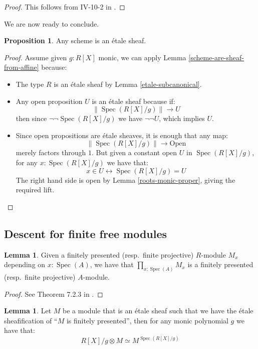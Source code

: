 \documentclass[10pt,a4paper]{article}
\theoremstyle{definition}
\newtheorem{lemma}[theorem]{Lemma}
\newtheorem{proposition}[theorem]{Proposition}
\DeclareMathOperator{\Spec}{Spec}
\newcommand{\propTrunc}[1]{\lVert #1 \rVert}
\begin{document}
\begin{proof}
  This follows from  IV-10-2 in \cite{lombardi-quitte}.
\end{proof}

We are now ready to conclude.

\begin{proposition}\label{scheme-is-etale-sheaf}
Any scheme is an \'etale sheaf.
\end{proposition}

\begin{proof}
Assume given $g:R[X]$ monic, we can apply Lemma \ref{scheme-are-sheaf-from-affine} because:
\begin{itemize}
\item The type $R$ is an \'etale sheaf by Lemma \ref{etale-subcanonical}.
\item Any open proposition $U$ is an \'etale sheaf because if:
\[\propTrunc{\Spec(R[X]/g)}\to U\]
then since $\neg\neg\Spec(R[X]/g)$ we have $\neg\neg U$, which implies $U$.
\item Since open propositions are \'etale sheaves, it is enough that any map:
\[\propTrunc{\Spec(R[X]/g)}\to \mathrm{Open}\]
merely factors through $1$. But given a constant open $U$ in $\Spec(R[X]/g)$, for any $x:\Spec(R[X]/g)$ we have that:
\[x\in U \leftrightarrow \Spec(R[X]/g) = U\]
The right hand side is open by Lemma \ref{roots-monic-proper}, giving the required lift. 
\end{itemize}
\end{proof}


\subsection{Descent for finite free modules}

\begin{lemma}\label{fp-equivalent-pointwise}
  Given a finitely presented (resp.\ finite projective)
  $R$-module $M_x$ depending on $x:\Spec(A)$, we have that $\prod_{x:\Spec(A)}M_x$ is a finitely presented (resp.\ finite projective) $A$-module.
\end{lemma}

\begin{proof}
See Theorem 7.2.3 in \cite{draft}.
\end{proof}

\begin{lemma}\label{descent-sqc-etale}
Let $M$ be a module that is an \'etale sheaf such that we have the \'etale sheafification of ``$M$ is finitely presented'', then for any monic polynomial $g$ we have that:
\[R[X]/g\otimes M \simeq M^{\Spec(R[X]/g)}\]
\end{lemma}
\end{document}
